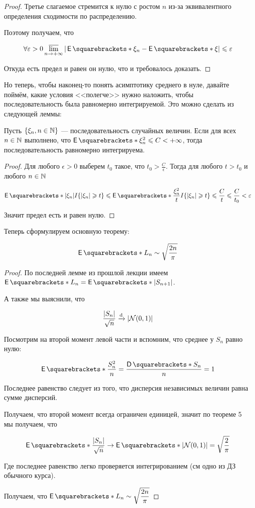 \begin{proof}
  Третье слагаемое стремится к нулю с ростом $n$ из-за эквивалентного определения
  сходимости по распределению.

  Поэтому получаем, что

  \[
    \forall \epsilon > 0 \varlimsup\limits_{n \to +\infty} |\E{\xi_n} - \E{\xi}| \leq \epsilon
  \]

  Откуда есть предел и равен он нулю, что и требовалось доказать.
\end{proof}


Но теперь, чтобы наконец-то понять асимптотику среднего в нуле, давайте
поймём, какие условия <<полегче>> нужно наложить, чтобы последовательность
была равномерно интегрируемой. Это можно сделать из следующей леммы:

\begin{lemma}
  Пусть $\{\xi_n, n \in \mathbb{N}\}$ --- последовательность случайных величин. Если
  для всех $n \in \mathbb{N}$ выполнено, что $\E{\xi_n^2} \leq C < +\infty$, тогда
  последовательность равномерно интегрируема.
\end{lemma}

\begin{proof}
  Для любого $\epsilon > 0$ выберем $t_0$ такое, что $t_0 > \frac{C}{\epsilon}$.
  Тогда для любого $t > t_0$ и любого $n \in \mathbb{N}$

  \[
    \E{|\xi_n|I\{|\xi_n| \geq t\}} \leq \E{\frac{\xi_n^2}{t}I\{|\xi_n| \geq t\}}
    \leq \frac{C}{t} \leq \frac{C}{t_0} < \epsilon
  \]

  Значит предел есть и равен нулю.
\end{proof}

Теперь сформулируем основную теорему:

\begin{theorem}
  \[
    \E{L_n} \sim \sqrt{\frac{2n}{\pi}}
  \]
\end{theorem}

\begin{proof}
  По последней лемме из прошлой лекции имеем $\E{L_n} = \E{|S_{n + 1}|}$.

  А также мы выяснили, что

  \[
    \frac{|S_n|}{\sqrt{n}} \xrightarrow{\mathrm{d}} |\mathcal{N}(0, 1)|
  \]

  Посмотрим на второй момент левой части и вспомним, что среднее у $S_n$ равно
  нулю:

  \[
    \E{\frac{S_n^2}{n}} = \frac{\D{S_n}}{n} = 1
  \]

  Последнее равенство следует из того, что дисперсия независимых величин равна
  сумме дисперсий.

  Получаем, что второй момент всегда ограничен единицей, значит по теореме 5
  мы получаем, что

  \[
    \E{\frac{|S_n|}{\sqrt{n}}} \to \E{|\mathcal{N}(0, 1)|} = \sqrt{\frac{2}{\pi}}
  \]

  Где последнее равенство легко проверяется интегрированием (см одно из ДЗ обычного
  курса).

  Получаем, что $\E{L_n} \sim \sqrt{\dfrac{2n}{\pi}}$
\end{proof}

